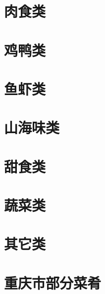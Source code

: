 \documentclass{cookbook}
\begin{document}
\begin{cookbook}

\tableofcontents

\section{肉食类}

\section{鸡鸭类}
\section{鱼虾类}
\section{山海味类}
\section{甜食类}
\section{蔬菜类}
\section{其它类}
\section{重庆市部分菜肴}

\end{cookbook}
\end{document}
